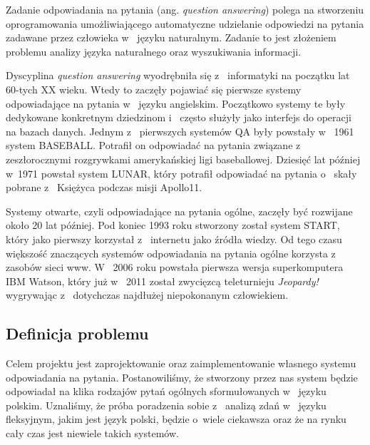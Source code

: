 

Zadanie odpowiadania na pytania (ang. \emph{question answering}) polega na stworzeniu oprogramowania umożliwiającego automatyczne udzielanie odpowiedzi na pytania zadawane przez człowieka w~ języku naturalnym. Zadanie to jest złożeniem problemu analizy języka naturalnego oraz wyszukiwania informacji.

Dyscyplina \emph{question answering} wyodrębniła się z~ informatyki na początku lat 60-tych XX wieku. Wtedy to zaczęły pojawiać się pierwsze systemy odpowiadające na pytania w~ języku angielskim. Początkowo systemy te były dedykowane konkretnym dziedzinom i~ często służyły jako interfejs do operacji na bazach danych. Jednym z~ pierwszych systemów QA były powstały  w~ 1961 system BASEBALL. Potrafił on odpowiadać na pytania związane z~ zeszłorocznymi rozgrywkami amerykańskiej ligi baseballowej. Dziesięć lat później w~1971 powstał system LUNAR, który potrafił odpowiadać na pytania o~ skały pobrane z~ Księżyca podczas misji Apollo11. 

Systemy otwarte, czyli odpowiadające na pytania ogólne, zaczęły być rozwijane około 20 lat później. Pod koniec 1993 roku stworzony został system START, który jako pierwszy korzystał z~ internetu jako źródła wiedzy. Od tego czasu większość znaczących systemów odpowiadania na pytania ogólne korzysta z~ zasobów sieci www. W~ 2006 roku powstała pierwsza wersja superkomputera IBM Watson, który już  w~ 2011 został zwycięzcą teleturnieju \emph{Jeopardy!} wygrywając z~ dotychczas najdłużej niepokonanym człowiekiem.

\subsection{Definicja problemu}\label{subsec:wpr:cel}
Celem projektu jest zaprojektowanie oraz zaimplementowanie własnego systemu odpowiadania na pytania. Postanowiliśmy, że stworzony przez nas system będzie odpowiadał na klika rodzajów pytań ogólnych sformułowanych w~ języku polskim. Uznaliśmy, że próba poradzenia sobie z~ analizą zdań w~ języku fleksyjnym, jakim jest język polski, będzie o~wiele ciekawsza oraz że na rynku cały czas jest niewiele takich systemów. 



